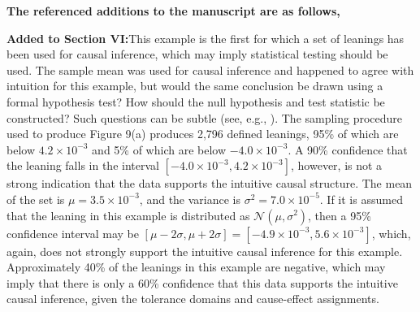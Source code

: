 \documentclass[a4paper,11pt]{article}
\begin{document}
{\bf The referenced additions to the manuscript are as follows,}

{\bf Added to Section VI:}This example is the first for which a set of leanings has been used for causal inference, which may imply statistical testing should be used.  The sample mean was used for causal inference and happened to agree with intuition for this example, but would the same conclusion be drawn using a formal hypothesis test?  How should the null hypothesis and test statistic be constructed?  Such questions can be subtle (see, e.g., \cite{Rubin2015}).  The sampling procedure used to produce Figure 9(a) produces 2,796 defined leanings, 95\% of which are below $4.2\times 10^{-3}$ and 5\% of which are below $-4.0\times 10^{-3}$.  A 90\% confidence that the leaning falls in the interval $[-4.0\times 10^{-3},4.2\times10^{-3}]$, however, is not a strong indication that the data supports the intuitive causal structure.  The mean of the set is $\mu = 3.5\times 10^{-3}$, and the variance is $\sigma^2 = 7.0\times 10^{-5}$.  If it is assumed that the leaning in this example is distributed as $\mathcal{N}(\mu,\sigma^2)$, then a 95\% confidence interval may be $[\mu-2\sigma,\mu+2\sigma]=[-4.9\times 10^{-3},5.6\times 10^{-3}]$, which, again, does not strongly support the intuitive causal inference for this example.  Approximately 40\% of the leanings in this example are negative, which may imply that there is only a 60\% confidence that this data supports the intuitive causal inference, given the tolerance domains and cause-effect assignments.  
\end{document}
